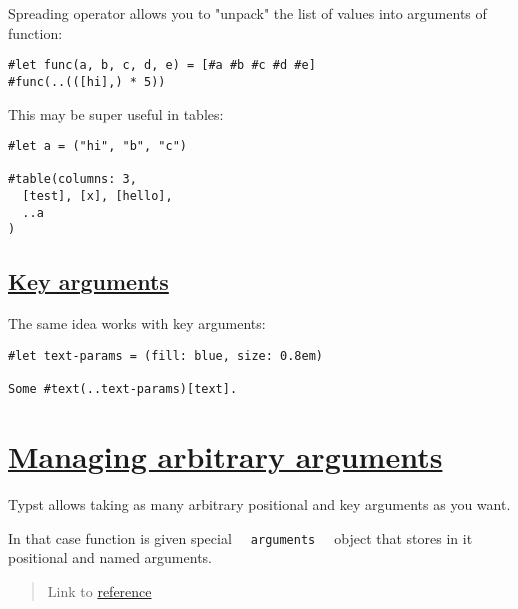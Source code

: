 Spreading operator allows you to "unpack" the list of values into
arguments of function:

\begin{verbatim}
#let func(a, b, c, d, e) = [#a #b #c #d #e]
#func(..(([hi],) * 5))
\end{verbatim}

\pandocbounded{}

This may be super useful in tables:

\begin{verbatim}
#let a = ("hi", "b", "c")

#table(columns: 3,
  [test], [x], [hello],
  ..a
)
\end{verbatim}

\pandocbounded{}

\subsection{\texorpdfstring{\hyperref[key-arguments]{Key
arguments}}{Key arguments}}\label{key-arguments}

The same idea works with key arguments:

\begin{verbatim}
#let text-params = (fill: blue, size: 0.8em)

Some #text(..text-params)[text].
\end{verbatim}

\pandocbounded{}

\section{\texorpdfstring{\hyperref[managing-arbitrary-arguments]{Managing
arbitrary
arguments}}{Managing arbitrary arguments}}\label{managing-arbitrary-arguments}

Typst allows taking as many arbitrary positional and key arguments as
you want.

In that case function is given special
\texttt{\ }{\texttt{\ arguments\ }}\texttt{\ } object that stores in it
positional and named arguments.

\begin{quote}
Link to
\href{https://typst.app/docs/reference/foundations/arguments/}{reference}
\end{quote}

